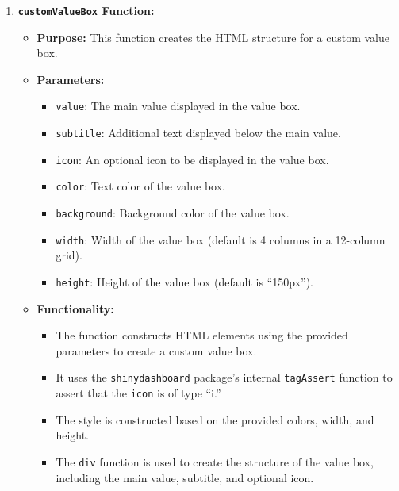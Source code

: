 \documentclass[
]{book}
\providecommand{\tightlist}{%
  \setlength{\itemsep}{0pt}\setlength{\parskip}{0pt}}
\begin{document}
\begin{enumerate}
\def\labelenumi{\arabic{enumi}.}
\tightlist
\item
  \textbf{\texttt{customValueBox} Function:}

  \begin{itemize}
  \tightlist
  \item
    \textbf{Purpose:} This function creates the HTML structure for a custom value box.
  \item
    \textbf{Parameters:}

    \begin{itemize}
    \tightlist
    \item
      \texttt{value}: The main value displayed in the value box.
    \item
      \texttt{subtitle}: Additional text displayed below the main value.
    \item
      \texttt{icon}: An optional icon to be displayed in the value box.
    \item
      \texttt{color}: Text color of the value box.
    \item
      \texttt{background}: Background color of the value box.
    \item
      \texttt{width}: Width of the value box (default is 4 columns in a 12-column grid).
    \item
      \texttt{height}: Height of the value box (default is ``150px'').
    \end{itemize}
  \item
    \textbf{Functionality:}

    \begin{itemize}
    \tightlist
    \item
      The function constructs HTML elements using the provided parameters to create a custom value box.
    \item
      It uses the \texttt{shinydashboard} package's internal \texttt{tagAssert} function to assert that the \texttt{icon} is of type ``i.''
    \item
      The style is constructed based on the provided colors, width, and height.
    \item
      The \texttt{div} function is used to create the structure of the value box, including the main value, subtitle, and optional icon.
    \end{itemize}
  \end{itemize}
\end{enumerate}
\end{document}

